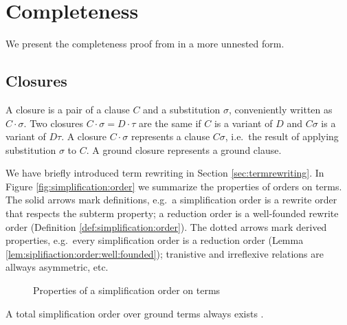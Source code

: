 
\chapter{Completeness}

We present the completeness proof from \cite{GK2004csl} in a more unnested form.

\section{Closures}

\begin{definition}
    A closure is a pair of a clause $C$ and a substitution $\sigma$,
    conveniently written as $C\cdot\sigma$. Two closures $C\cdot\sigma = D\cdot\tau$
    are the same if $C$ is a variant of $D$ and $C\sigma$ is a variant of $D\tau$.
    A closure $C\cdot\sigma$ represents a clause $C\sigma$,
    i.e.~the result of applying substitution $\sigma$ to $C$.
    A ground closure represents a ground clause.
\end{definition}

We have briefly introduced term rewriting in Section \vref{sec:termrewriting}.
In Figure \vref{fig:simplification:order} we summarize the properties of orders on terms.
The solid arrows mark definitions,
e.g.~a simplification order is a rewrite order
that respects the subterm property;
a reduction order is a well-founded rewrite order
(Definition \ref{def:simplification:order}).
The dotted arrows mark derived properties,
e.g.~every simplification order is a reduction order
(Lemma \ref{lem:siplifiaction:order:well:founded});
tranistive and irreflexive relations are allways asymmetric,
etc.
%
\begin{center}
\begin{figure}\label{fig:simplification:order}
    
    \caption{Properties of a simplification order on terms}
\end{figure}
\end{center}
%
\begin{lemma}
    A total simplification order
    over ground terms always exists \cite{NR2001}.
\end{lemma}

